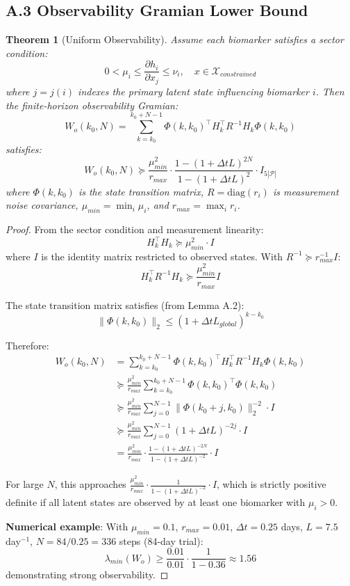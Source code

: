\documentclass[11pt,letterpaper]{article}
\newtheorem{theorem}{Theorem}[section]
\begin{document}
\subsection*{A.3 Observability Gramian Lower Bound}

\begin{theorem}[Uniform Observability]
Assume each biomarker satisfies a sector condition:
\[
0 < \mu_i \leq \frac{\partial h_i}{\partial x_j} \leq \nu_i, \quad x \in \mathcal{X}_{constrained}
\]
where $j = j(i)$ indexes the primary latent state influencing biomarker $i$. Then the finite-horizon observability Gramian:
\[
W_o(k_0, N) = \sum_{k=k_0}^{k_0+N-1} \Phi(k, k_0)^\top H_k^\top R^{-1} H_k \Phi(k, k_0)
\]
satisfies:
\[
W_o(k_0, N) \succeq \frac{\mu_{min}^2}{r_{max}} \cdot \frac{1 - (1 + \Delta t L)^{2N}}{1 - (1 + \Delta t L)^2} \cdot I_{5|\mathcal{P}|}
\]
where $\Phi(k, k_0)$ is the state transition matrix, $R = \text{diag}(r_i)$ is measurement noise covariance, $\mu_{min} = \min_i \mu_i$, and $r_{max} = \max_i r_i$.
\end{theorem}

\begin{proof}
From the sector condition and measurement linearity:
\[
H_k^\top H_k \succeq \mu_{min}^2 \cdot I
\]
where $I$ is the identity matrix restricted to observed states. With $R^{-1} \succeq r_{max}^{-1} I$:
\[
H_k^\top R^{-1} H_k \succeq \frac{\mu_{min}^2}{r_{max}} I
\]

The state transition matrix satisfies (from Lemma A.2):
\[
\|\Phi(k, k_0)\|_2 \leq (1 + \Delta t L_{global})^{k - k_0}
\]

Therefore:
\begin{align*}
W_o(k_0, N) &= \sum_{k=k_0}^{k_0+N-1} \Phi(k, k_0)^\top H_k^\top R^{-1} H_k \Phi(k, k_0) \\
&\succeq \frac{\mu_{min}^2}{r_{max}} \sum_{k=k_0}^{k_0+N-1} \Phi(k, k_0)^\top \Phi(k, k_0) \\
&\succeq \frac{\mu_{min}^2}{r_{max}} \sum_{j=0}^{N-1} \|\Phi(k_0+j, k_0)\|_2^{-2} \cdot I \\
&\succeq \frac{\mu_{min}^2}{r_{max}} \sum_{j=0}^{N-1} (1 + \Delta t L)^{-2j} \cdot I \\
&= \frac{\mu_{min}^2}{r_{max}} \cdot \frac{1 - (1 + \Delta t L)^{-2N}}{1 - (1 + \Delta t L)^{-2}} \cdot I
\end{align*}

For large $N$, this approaches $\frac{\mu_{min}^2}{r_{max}} \cdot \frac{1}{1 - (1 + \Delta t L)^{-2}} \cdot I$, which is strictly positive definite if all latent states are observed by at least one biomarker with $\mu_i > 0$.

\textbf{Numerical example}: With $\mu_{min} = 0.1$, $r_{max} = 0.01$, $\Delta t = 0.25$ days, $L = 7.5$ day$^{-1}$, $N = 84/0.25 = 336$ steps (84-day trial):
\[
\lambda_{min}(W_o) \geq \frac{0.01}{0.01} \cdot \frac{1}{1 - 0.36} \approx 1.56
\]
demonstrating strong observability.
\end{proof}
\end{document}
